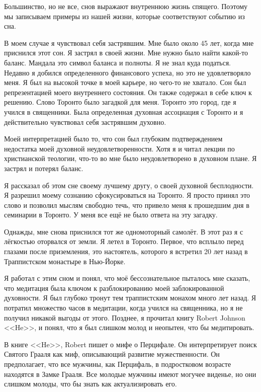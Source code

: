 \documentclass[10pt, fleqn]{article}
\begin{document}
Большинство, но не все, снов выражают внутреннюю жизнь спящего. Поэтому мы записываем примеры из нашей жизни, которые соответствуют событию из сна.

В моем случае я чувствовал себя застрявшим. Мне было около 45 лет, когда мне приснился этот сон. Я застрял в своей жизни. Мне нужно было найти какой-то баланс. Мандала это символ баланса и полноты. Я не знал куда податься. Недавно я добился определенного финансового успеха, но это не удовлетворяло меня. Я был на высокой точке в моей карьере, но чего-то не хватало. Сон был репрезентацией моего внутреннего состояния. Он также содержал в себе ключ к решению. Слово Торонто было загадкой для меня. Торонто это город, где я учился в священники. Была определенная духовная ассоциация с Торонто и я действительно чувствовал себя застрявшим духовно.


Моей интерпретацией было то, что сон был глубоким подтверждением недостатка моей духовной неудовлетворенности. Хотя я и читал лекции по христианской теологии, что-то во мне было неудовлетворено в духовном плане. Я застрял и потерял баланс.



Я рассказал об этом сне своему лучшему другу, о своей духовной бесплодности. Я разрешил моему сознанию сфокусироваться на Торонто. Я просто принял это слово и позволил мыслям свободно течь, что привело меня к прошедшим дня в семинарии в Торонто. У меня все ещё не было ответа на эту загадку.

Однажды, мне снова приснился тот же одномоторный самолёт. В этот раз я с лёгкостью оторвался от земли. Я летел в Торонто. Первое, что всплыло перед глазами после приземления, это настоятель, которого я встретил 20 лет назад в Траппистском монастыре в Нью-Йорке.

Я работал с этим сном и понял, что моё бессознательное пыталось мне сказать, что медитация была ключом к разблокированию моей заблокированной духовности. Я был глубоко тронут тем траппистским монахом много лет назад. Я потратил множество часов в медитации, когда учился на священника, но я не получил никакой выгоды от этого. Позднее, я прочитал книгу Robert Johnson <<He>>, и понял, что я был слишком молод и неопытен, что бы медитировать.

В книге <<He>>, Robert пишет о мифе о Перцифале. Он интерпретирует поиск Святого Грааля как миф, описывающий развитие мужественности. Он предполагает, что все мужчины, как Перцифаль, в подростковом возрасте находятся в Замке Грааля. Все молодые мужчины имеют могучее виденье, но они слишком молоды, что бы знать как актуализировать его.
\end{document}
